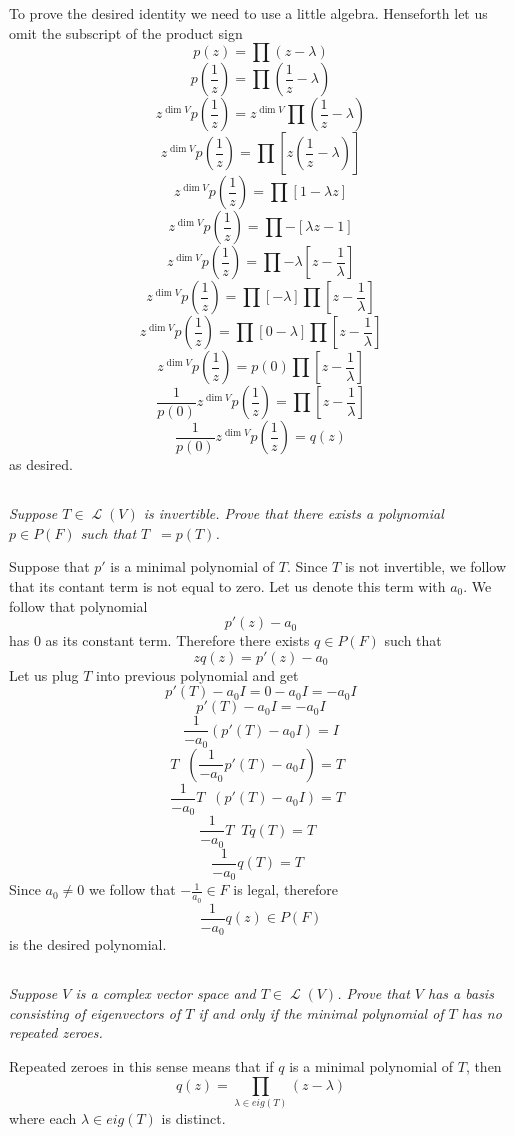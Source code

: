 \documentclass[11pt,oneside,titlepage]{book}
\DeclareMathOperator \map {\mathcal {L}}
\DeclareMathOperator \inv {^{-1}}
\begin{document}
To prove the desired identity we need to use a little algebra. Henseforth let us omit the
subscript of the product sign
$$p(z) = \prod{(z - \lambda)}$$
$$p(\frac{1}{z}) = \prod{(\frac{1}{z} - \lambda)}$$
$$z^{\dim V} p(\frac{1}{z}) = z^{\dim V} \prod{(\frac{1}{z} - \lambda)}$$
$$z^{\dim V} p(\frac{1}{z}) = \prod{[z (\frac{1}{z} - \lambda)]}$$
$$z^{\dim V} p(\frac{1}{z}) = \prod{[1 - \lambda z]}$$
$$z^{\dim V} p(\frac{1}{z}) = \prod{- [\lambda z - 1]}$$
$$z^{\dim V} p(\frac{1}{z}) = \prod{- \lambda [ z - \frac{1}{\lambda}]}$$
$$z^{\dim V} p(\frac{1}{z}) = \prod{[-\lambda]} \prod{[ z - \frac{1}{\lambda}]}$$
$$z^{\dim V} p(\frac{1}{z}) = \prod{[0 -\lambda]} \prod{[ z - \frac{1}{\lambda}]}$$
$$z^{\dim V} p(\frac{1}{z}) = p(0) \prod{[ z - \frac{1}{\lambda}]}$$
$$\frac{1}{p(0)}z^{\dim V} p(\frac{1}{z}) = \prod{[ z - \frac{1}{\lambda}]}$$
$$\frac{1}{p(0)}z^{\dim V} p(\frac{1}{z}) = q(z)$$
as desired.

\subsection{}

\textit{Suppose $T \in \map(V)$ is invertible. Prove that there exists a polynomial
  $p \in P(F)$ such that $T \inv = p(T)$.}

Suppose that $p'$ is a minimal polynomial of $T$. Since $T$ is not invertible, we follow that
its contant term is not equal to zero. Let us denote this term with $a_0$.
We follow that polynomial
$$p'(z) - a_0$$
has 0 as its constant term. Therefore there exists $q \in P(F)$ such that
$$z q(z) = p'(z) - a_0$$
Let us plug $T$ into previous polynomial and get
$$p'(T) - a_0I = 0 - a_0I = -a_0I$$
$$p'(T) - a_0I = -a_0I$$
$$\frac{1}{-a_0} (p'(T) - a_0I) = I$$
$$T\inv(\frac{1}{-a_0} p'(T) - a_0I) = T \inv$$
$$\frac{1}{-a_0} T\inv(p'(T) - a_0I) = T \inv$$
$$\frac{1}{-a_0} T\inv T q(T) = T \inv$$
$$\frac{1}{-a_0}  q(T) = T \inv$$
Since $a_0 \neq 0$ we follow that $-\frac{1}{a_0} \in F$ is legal, therefore
$$\frac{1}{-a_0} q(z) \in P(F)$$
is the desired polynomial.

\subsection{}

\textit{Suppose $V$ is a complex vector space and $T \in \map(V)$. Prove that $V$ has
  a basis consisting of eigenvectors of $T$ if and only if the minimal polynomial of $T$
  has no repeated zeroes.}

Repeated zeroes in this sense means that if $q$ is a minimal polynomial of $T$, then
$$q(z) = \prod_{\lambda \in eig(T)}{(z - \lambda)}$$
where each $\lambda \in eig(T)$ is distinct.
\end{document}
